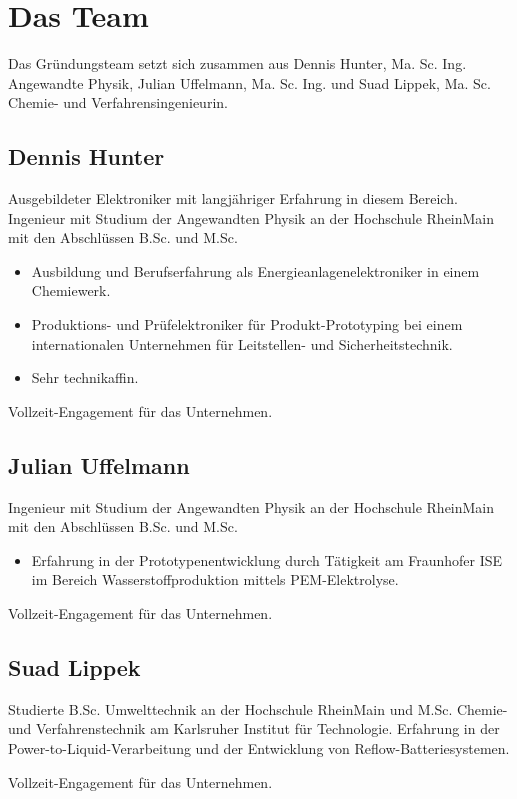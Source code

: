 \chapter{Das Team}

Das Gründungsteam setzt sich zusammen aus Dennis Hunter, Ma. Sc. Ing. Angewandte Physik, Julian Uffelmann, Ma. Sc. Ing. und Suad Lippek, Ma. Sc. Chemie- und Verfahrensingenieurin.

\section{Dennis Hunter}

    Ausgebildeter Elektroniker mit langjähriger Erfahrung in diesem Bereich.
    Ingenieur mit Studium der Angewandten Physik an der Hochschule RheinMain mit den Abschlüssen B.Sc. und M.Sc.
    \begin{itemize}
        \item Ausbildung und Berufserfahrung als Energieanlagenelektroniker in einem Chemiewerk.
        \item Produktions- und Prüfelektroniker für Produkt-Prototyping bei einem internationalen Unternehmen für Leitstellen- und Sicherheitstechnik.
        \item Sehr technikaffin.
    \end{itemize}
    Vollzeit-Engagement für das Unternehmen.

\section{Julian Uffelmann}

    Ingenieur mit Studium der Angewandten Physik an der Hochschule RheinMain mit den Abschlüssen B.Sc. und M.Sc.
    \begin{itemize}
        \item Erfahrung in der Prototypenentwicklung durch Tätigkeit am Fraunhofer ISE im Bereich Wasserstoffproduktion mittels PEM-Elektrolyse.
    \end{itemize}
    Vollzeit-Engagement für das Unternehmen.

\section{Suad Lippek}

    Studierte B.Sc. Umwelttechnik an der Hochschule RheinMain und M.Sc. Chemie- und Verfahrenstechnik am Karlsruher Institut für Technologie.
    Erfahrung in der Power-to-Liquid-Verarbeitung und der Entwicklung von Reflow-Batteriesystemen.

    Vollzeit-Engagement für das Unternehmen.
